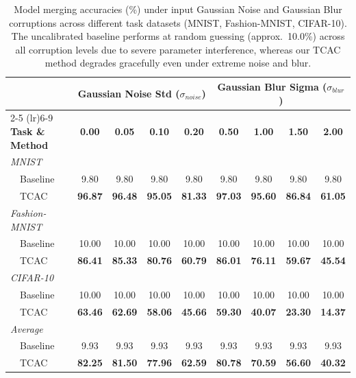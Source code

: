 \documentclass{article}
\theoremstyle{plain}
\theoremstyle{definition}
\theoremstyle{remark}
\begin{document}
\begin{table}[h]
\centering
\caption{Model merging accuracies (\%) under input Gaussian Noise and Gaussian Blur corruptions across different task datasets (MNIST, Fashion-MNIST, CIFAR-10). The uncalibrated baseline performs at random guessing (approx.\ 10.0\%) across all corruption levels due to severe parameter interference, whereas our TCAC method degrades gracefully even under extreme noise and blur.}
\label{tab:noise_robustness_data}
\vskip 0.1in
\begin{tabular}{lcccccccc}
\toprule
 & \multicolumn{4}{c}{\textbf{Gaussian Noise Std ($\sigma_{noise}$)}} & \multicolumn{4}{c}{\textbf{Gaussian Blur Sigma ($\sigma_{blur}$)}} \\
\cmidrule(lr){2-5} \cmidrule(lr){6-9}
\textbf{Task \& Method} & \textbf{0.00} & \textbf{0.05} & \textbf{0.10} & \textbf{0.20} & \textbf{0.50} & \textbf{1.00} & \textbf{1.50} & \textbf{2.00} \\
\midrule
\textit{MNIST} \\
~~Baseline & 9.80 & 9.80 & 9.80 & 9.80 & 9.80 & 9.80 & 9.80 & 9.80 \\
~~TCAC & \textbf{96.87} & \textbf{96.48} & \textbf{95.05} & \textbf{81.33} & \textbf{97.03} & \textbf{95.60} & \textbf{86.84} & \textbf{61.05} \\
\midrule
\textit{Fashion-MNIST} \\
~~Baseline & 10.00 & 10.00 & 10.00 & 10.00 & 10.00 & 10.00 & 10.00 & 10.00 \\
~~TCAC & \textbf{86.41} & \textbf{85.33} & \textbf{80.76} & \textbf{60.79} & \textbf{86.01} & \textbf{76.11} & \textbf{59.67} & \textbf{45.54} \\
\midrule
\textit{CIFAR-10} \\
~~Baseline & 10.00 & 10.00 & 10.00 & 10.00 & 10.00 & 10.00 & 10.00 & 10.00 \\
~~TCAC & \textbf{63.46} & \textbf{62.69} & \textbf{58.06} & \textbf{45.66} & \textbf{59.30} & \textbf{40.07} & \textbf{23.30} & \textbf{14.37} \\
\midrule
\textit{Average} \\
~~Baseline & 9.93 & 9.93 & 9.93 & 9.93 & 9.93 & 9.93 & 9.93 & 9.93 \\
~~TCAC & \textbf{82.25} & \textbf{81.50} & \textbf{77.96} & \textbf{62.59} & \textbf{80.78} & \textbf{70.59} & \textbf{56.60} & \textbf{40.32} \\
\bottomrule
\end{tabular}
\end{table}
\end{document}
